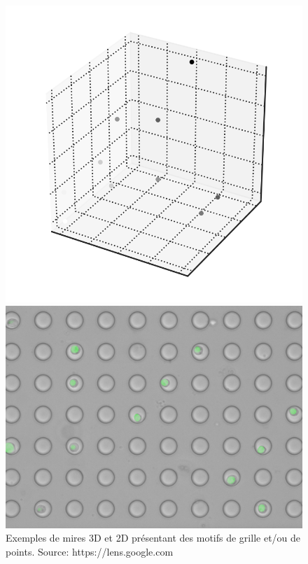 \begin{itemize}[label={\Huge$\star$}]
\begin{figure}[h]
{\begin{minipage}{0.23\textwidth}
  	\end{minipage}\hfill
  	\begin{minipage}{0.23\textwidth}
  		\centering
  		\includegraphics[width=\linewidth]{images/mire3}
  	\end{minipage}\hfill
  	\begin{minipage}{0.23\textwidth}
  		\centering
  		\includegraphics[width=\linewidth]{images/mire4}
  	\end{minipage}
  }
  \caption[Exemples de mires]{ Exemples de mires 3D et 2D présentant des motifs de grille et/ou de points. Source: https://lens.google.com}
  \label{fig:Exemples de mires}
  \end{figure}
  

\end{itemize}
